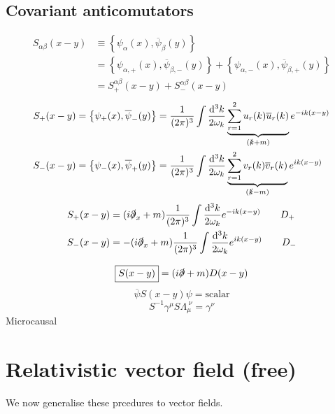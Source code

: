 \subsection{Covariant anticomutators}
\begin{align*}
S_{\alpha\beta}(x-y) &\equiv \left\{\psi_\alpha(x), \overline{\psi}_\beta(y)\right\} \\
&= \left\{\psi_{\alpha,+}(x), \overline{\psi}_{\beta,-}(y)\right\} + \left\{\psi_{\alpha,-}(x), \overline{\psi}_{\beta,+}(y)\right\} \\
&= S^{\alpha\beta}_+(x-y) + S_-^{\alpha\beta}(x-y)
\end{align*}
\begin{align*}
S_+(x-y) &= \left\{\psi_+(x), \overline{\psi}_-(y)\right\} = \frac{1}{(2\pi)^3}\int \frac{\operatorname{d \!}{^3k}}{2\omega_k}\underbrace{\sum^2_{r=1}u_r(k)\overline{u}_r(k)}_{(\slashed{k}+m)}e^{-ik(x-y)} \\
S_-(x-y) &= \left\{\psi_-(x), \overline{\psi}_+(y)\right\} = \frac{1}{(2\pi)^3}\int \frac{\operatorname{d \!}{^3k}}{2\omega_k}\underbrace{\sum^2_{r=1}v_r(k)\overline{v}_r(k)}_{(\slashed{k}-m)}e^{ik(x-y)}
\end{align*}
\begin{align*}
S_+(x-y) &= (i\slashed{\partial}_x+m)\frac{1}{(2\pi)^3}\int \frac{\operatorname{d \!}{^3k}}{2\omega_k}e^{-ik(x-y)} \qquad D_+ \\
S_-(x-y) &= -(i\slashed{\partial}_x+m)\frac{1}{(2\pi)^3}\int \frac{\operatorname{d \!}{^3k}}{2\omega_k}e^{ik(x-y)} \qquad D_- 
\end{align*}

\[\boxed{S(x-y)}=(i\slashed{\partial}+m)D(x-y)\]
\[\overline{\psi}S(x-y)\psi = \text{scalar}\]
\[ S^{-1}\gamma^\mu S\Lambda_\mu^{\;\nu} = \gamma^\nu \]
Microcausal

\section{Relativistic vector field (free)}



We now generalise these prcedures to vector fields.
